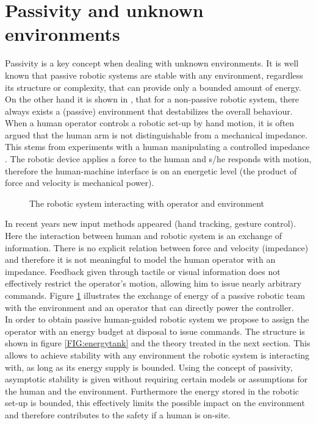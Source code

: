 \documentclass[a4paper,twoside, openright,12pt]{report}
\begin{document}
\section{Passivity and unknown environments} 
Passivity is a key concept when dealing with unknown environments. It is well known that passive robotic systems are stable with any environment, regardless its structure or complexity, that can provide only a bounded amount of energy. On the other hand it is shown in \cite{Stramigioli_15}, that for a non-passive robotic system, there always exists a (passive) environment that destabilizes the overall behaviour.\\
When a human operator controls a robotic set-up by hand motion, it is often argued that the human arm is not distinguishable from a mechanical impedance. This stems from experiments with a human manipulating a controlled impedance \cite{Hogan_89}. The robotic device applies a force to the human and s/he responds with motion, therefore the human-machine interface is on an energetic level (the product of force and velocity is mechanical power).
\begin{figure}[b!]
	\centering
	\small
	\def\svgwidth{0.95\columnwidth}
	
	\vspace{10pt}
	\caption{The robotic system interacting with operator and environment}
	\label{FIG:passivityenvironment}
\end{figure}
In recent years new input methods appeared (hand tracking, gesture control). Here the interaction between human and robotic system is an exchange of information. There is no explicit relation between force and velocity (impedance) and therefore it is not meaningful to model the human operator with an impedance. Feedback given through tactile or visual information does not effectively restrict the operator's motion, allowing him to issue nearly arbitrary commands. Figure \ref{FIG:passivityenvironment} illustrates the exchange of energy of a passive robotic team with the environment and an operator that can directly power the controller.\\
In order to obtain passive human-guided robotic system we propose to assign the operator with an energy budget at disposal to issue commands. The structure is shown in figure \ref{FIG:energytank} and the theory treated in the next section. This allows to achieve stability with any environment the robotic system is interacting with, as long as its energy supply is bounded. Using the concept of passivity, asymptotic stability is given without requiring certain models or assumptions for the human and the environment. Furthermore the energy stored in the robotic set-up is bounded, this effectively limits the possible impact on the environment and therefore contributes to the safety if a human is on-site.       
   
\end{document}
